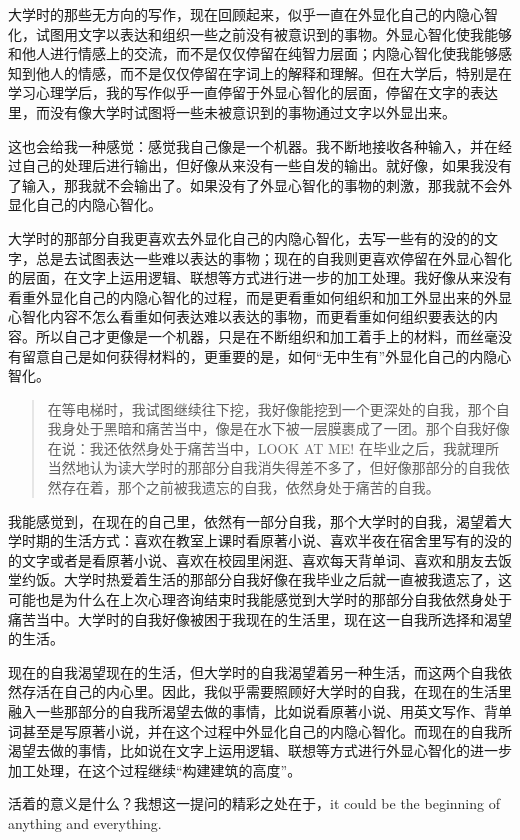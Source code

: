大学时的那些无方向的写作，现在回顾起来，似乎一直在外显化自己的内隐心智化，试图用文字以表达和组织一些之前没有被意识到的事物。外显心智化使我能够和他人进行情感上的交流，而不是仅仅停留在纯智力层面；内隐心智化使我能够感知到他人的情感，而不是仅仅停留在字词上的解释和理解。但在大学后，特别是在学习心理学后，我的写作似乎一直停留于外显心智化的层面，停留在文字的表达里，而没有像大学时试图将一些未被意识到的事物通过文字以外显出来。

这也会给我一种感觉：感觉我自己像是一个机器。我不断地接收各种输入，并在经过自己的处理后进行输出，但好像从来没有一些自发的输出。就好像，如果我没有了输入，那我就不会输出了。如果没有了外显心智化的事物的刺激，那我就不会外显化自己的内隐心智化。

大学时的那部分自我更喜欢去外显化自己的内隐心智化，去写一些有的没的的文字，总是去试图表达一些难以表达的事物；现在的自我则更喜欢停留在外显心智化的层面，在文字上运用逻辑、联想等方式进行进一步的加工处理。我好像从来没有看重外显化自己的内隐心智化的过程，而是更看重如何组织和加工外显出来的外显心智化内容\pozhehao{}不怎么看重如何表达难以表达的事物，而更看重如何组织要表达的内容。所以自己才更像是一个机器，只是在不断组织和加工着手上的材料，而丝毫没有留意自己是如何获得材料的，更重要的是，如何“无中生有”\pozhehao{}外显化自己的内隐心智化。

\blockquote{
    在等电梯时，我试图继续往下挖，我好像能挖到一个更深处的自我，那个自我身处于黑暗和痛苦当中，像是在水下被一层膜裹成了一团。那个自我好像在说：我还依然身处于痛苦当中，LOOK AT ME!  在毕业之后，我就理所当然地认为读大学时的那部分自我消失得差不多了，但好像那部分的自我依然存在着，那个之前被我遗忘的自我，依然身处于痛苦的自我。
}

我能感觉到，在现在的自己里，依然有一部分自我，那个大学时的自我，渴望着大学时期的生活方式：喜欢在教室上课时看原著小说、喜欢半夜在宿舍里写有的没的的文字或者是看原著小说、喜欢在校园里闲逛、喜欢每天背单词、喜欢和朋友去饭堂约饭。大学时热爱着生活的那部分自我好像在我毕业之后就一直被我遗忘了，这可能也是为什么在上次心理咨询结束时我能感觉到大学时的那部分自我依然身处于痛苦当中。大学时的自我好像被困于我现在的生活里，现在这一自我所选择和渴望的生活。

现在的自我渴望现在的生活，但大学时的自我渴望着另一种生活，而这两个自我依然存活在自己的内心里。因此，我似乎需要照顾好大学时的自我，在现在的生活里融入一些那部分的自我所渴望去做的事情，比如说看原著小说、用英文写作、背单词甚至是写原著小说，并在这个过程中外显化自己的内隐心智化。而现在的自我所渴望去做的事情，比如说在文字上运用逻辑、联想等方式进行外显心智化的进一步加工处理，在这个过程继续“构建建筑的高度”。


活着的意义是什么？我想这一提问的精彩之处在于，it could be the beginning of anything and everything.
